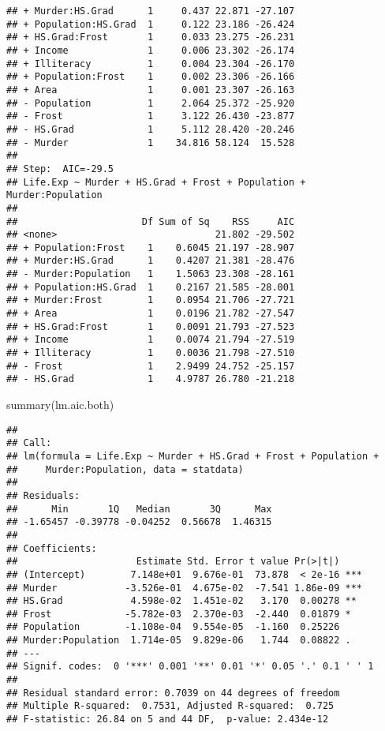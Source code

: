 \documentclass[
]{article}
\newenvironment{Shaded}{\begin{snugshade}}{\end{snugshade}}
\newcommand{\FunctionTok}[1]{\textcolor[rgb]{0.00,0.00,0.00}{#1}}
\newcommand{\NormalTok}[1]{#1}
\begin{document}
\begin{verbatim}
## + Murder:HS.Grad      1     0.437 22.871 -27.107
## + Population:HS.Grad  1     0.122 23.186 -26.424
## + HS.Grad:Frost       1     0.033 23.275 -26.231
## + Income              1     0.006 23.302 -26.174
## + Illiteracy          1     0.004 23.304 -26.170
## + Population:Frost    1     0.002 23.306 -26.166
## + Area                1     0.001 23.307 -26.163
## - Population          1     2.064 25.372 -25.920
## - Frost               1     3.122 26.430 -23.877
## - HS.Grad             1     5.112 28.420 -20.246
## - Murder              1    34.816 58.124  15.528
## 
## Step:  AIC=-29.5
## Life.Exp ~ Murder + HS.Grad + Frost + Population + Murder:Population
## 
##                      Df Sum of Sq    RSS     AIC
## <none>                            21.802 -29.502
## + Population:Frost    1    0.6045 21.197 -28.907
## + Murder:HS.Grad      1    0.4207 21.381 -28.476
## - Murder:Population   1    1.5063 23.308 -28.161
## + Population:HS.Grad  1    0.2167 21.585 -28.001
## + Murder:Frost        1    0.0954 21.706 -27.721
## + Area                1    0.0196 21.782 -27.547
## + HS.Grad:Frost       1    0.0091 21.793 -27.523
## + Income              1    0.0074 21.794 -27.519
## + Illiteracy          1    0.0036 21.798 -27.510
## - Frost               1    2.9499 24.752 -25.157
## - HS.Grad             1    4.9787 26.780 -21.218
\end{verbatim}

\begin{Shaded}
\begin{Highlighting}[]
\FunctionTok{summary}\NormalTok{(lm.aic.both)}
\end{Highlighting}
\end{Shaded}

\begin{verbatim}
## 
## Call:
## lm(formula = Life.Exp ~ Murder + HS.Grad + Frost + Population + 
##     Murder:Population, data = statdata)
## 
## Residuals:
##      Min       1Q   Median       3Q      Max 
## -1.65457 -0.39778 -0.04252  0.56678  1.46315 
## 
## Coefficients:
##                     Estimate Std. Error t value Pr(>|t|)    
## (Intercept)        7.148e+01  9.676e-01  73.878  < 2e-16 ***
## Murder            -3.526e-01  4.675e-02  -7.541 1.86e-09 ***
## HS.Grad            4.598e-02  1.451e-02   3.170  0.00278 ** 
## Frost             -5.782e-03  2.370e-03  -2.440  0.01879 *  
## Population        -1.108e-04  9.554e-05  -1.160  0.25226    
## Murder:Population  1.714e-05  9.829e-06   1.744  0.08822 .  
## ---
## Signif. codes:  0 '***' 0.001 '**' 0.01 '*' 0.05 '.' 0.1 ' ' 1
## 
## Residual standard error: 0.7039 on 44 degrees of freedom
## Multiple R-squared:  0.7531, Adjusted R-squared:  0.725 
## F-statistic: 26.84 on 5 and 44 DF,  p-value: 2.434e-12
\end{verbatim}
\end{document}
